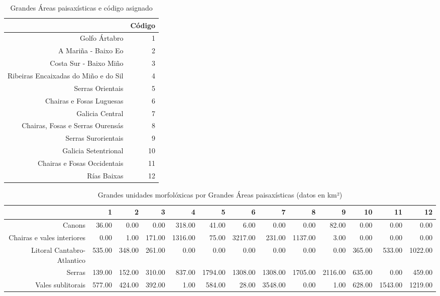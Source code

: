 \begin{table}[p]
\centering
\caption{Grandes Áreas paisaxísticas e código asignado} 
\label{xtaboa0}
\begin{tabular}{rr}
  \hline
 & Código \\ 
  \hline
Golfo Ártabro &   1 \\ 
  A Mariña - Baixo Eo &   2 \\ 
  Costa Sur - Baixo Miño &   3 \\ 
  Ribeiras Encaixadas do Miño e do Sil &   4 \\ 
  Serras Orientais &   5 \\ 
  Chairas e Fosas Luguesas &   6 \\ 
  Galicia Central &   7 \\ 
  Chairas, Fosas e Serras Ourensás &   8 \\ 
  Serras Surorientais &   9 \\ 
  Galicia Setentrional &  10 \\ 
  Chairas e Fosas Occidentais &  11 \\ 
  Rías Baixas &  12 \\ 
   \hline
\end{tabular}
\end{table}
\begin{table}[p]
\centering
\caption{Grandes unidades morfolóxicas por Grandes Áreas paisaxísticas (datos en km²)} 
\label{xtaboa1}
\begin{tabular}{rrrrrrrrrrrrr}
  \hline
 & 1 & 2 & 3 & 4 & 5 & 6 & 7 & 8 & 9 & 10 & 11 & 12 \\ 
  \hline
Canons & 36.00 & 0.00 & 0.00 & 318.00 & 41.00 & 6.00 & 0.00 & 0.00 & 82.00 & 0.00 & 0.00 & 0.00 \\ 
  Chairas e vales interiores & 0.00 & 1.00 & 171.00 & 1316.00 & 75.00 & 3217.00 & 231.00 & 1137.00 & 3.00 & 0.00 & 0.00 & 0.00 \\ 
  Litoral Cantabro-Atlantico & 535.00 & 348.00 & 261.00 & 0.00 & 0.00 & 0.00 & 0.00 & 0.00 & 0.00 & 365.00 & 533.00 & 1022.00 \\ 
  Serras & 139.00 & 152.00 & 310.00 & 837.00 & 1794.00 & 1308.00 & 1308.00 & 1705.00 & 2116.00 & 635.00 & 0.00 & 459.00 \\ 
  Vales sublitorais & 577.00 & 424.00 & 392.00 & 1.00 & 584.00 & 28.00 & 3548.00 & 0.00 & 1.00 & 628.00 & 1543.00 & 1219.00 \\ 
   \hline
\end{tabular}
\end{table}
